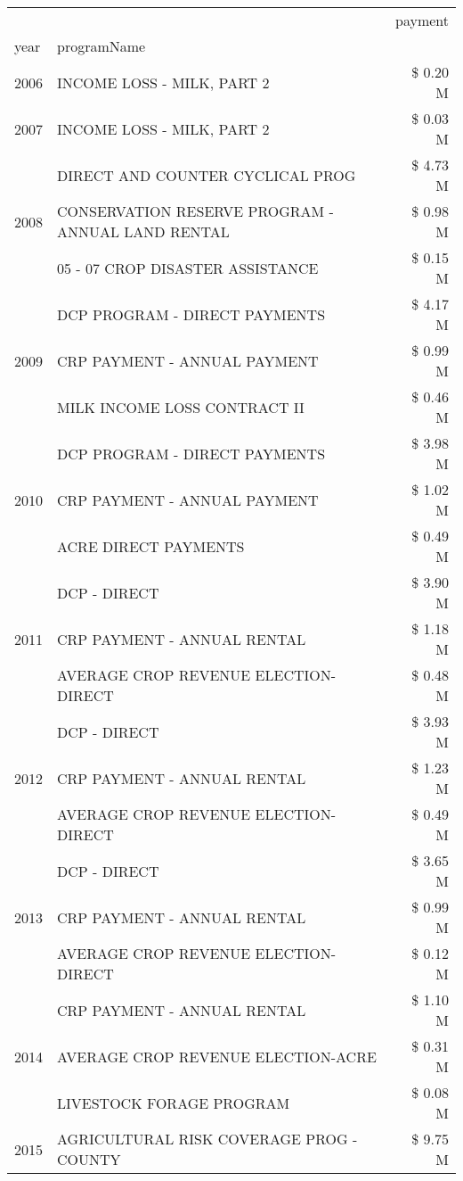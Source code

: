 \begin{tabular}{llr}
\toprule
 &  & payment \\
year & programName &  \\
\midrule
2006 & INCOME LOSS - MILK, PART 2 & \$ 0.20 M \\
\cline{1-3}
2007 & INCOME LOSS - MILK, PART 2 & \$ 0.03 M \\
\cline{1-3}
\multirow[t]{3}{*}{2008} & DIRECT AND COUNTER CYCLICAL PROG & \$ 4.73 M \\
 & CONSERVATION RESERVE PROGRAM - ANNUAL LAND RENTAL & \$ 0.98 M \\
 & 05 - 07 CROP DISASTER ASSISTANCE & \$ 0.15 M \\
\cline{1-3}
\multirow[t]{3}{*}{2009} & DCP PROGRAM - DIRECT PAYMENTS & \$ 4.17 M \\
 & CRP PAYMENT - ANNUAL PAYMENT & \$ 0.99 M \\
 & MILK INCOME LOSS CONTRACT II & \$ 0.46 M \\
\cline{1-3}
\multirow[t]{3}{*}{2010} & DCP PROGRAM - DIRECT PAYMENTS & \$ 3.98 M \\
 & CRP PAYMENT - ANNUAL PAYMENT & \$ 1.02 M \\
 & ACRE DIRECT PAYMENTS & \$ 0.49 M \\
\cline{1-3}
\multirow[t]{3}{*}{2011} & DCP - DIRECT & \$ 3.90 M \\
 & CRP PAYMENT - ANNUAL RENTAL & \$ 1.18 M \\
 & AVERAGE CROP REVENUE ELECTION-DIRECT & \$ 0.48 M \\
\cline{1-3}
\multirow[t]{3}{*}{2012} & DCP - DIRECT & \$ 3.93 M \\
 & CRP PAYMENT - ANNUAL RENTAL & \$ 1.23 M \\
 & AVERAGE CROP REVENUE ELECTION-DIRECT & \$ 0.49 M \\
\cline{1-3}
\multirow[t]{3}{*}{2013} & DCP - DIRECT & \$ 3.65 M \\
 & CRP PAYMENT - ANNUAL RENTAL & \$ 0.99 M \\
 & AVERAGE CROP REVENUE ELECTION-DIRECT & \$ 0.12 M \\
\cline{1-3}
\multirow[t]{3}{*}{2014} & CRP PAYMENT - ANNUAL RENTAL & \$ 1.10 M \\
 & AVERAGE CROP REVENUE ELECTION-ACRE & \$ 0.31 M \\
 & LIVESTOCK FORAGE PROGRAM & \$ 0.08 M \\
\cline{1-3}
\multirow[t]{3}{*}{2015} & AGRICULTURAL RISK COVERAGE PROG - COUNTY & \$ 9.75 M \\

\end{tabular}
